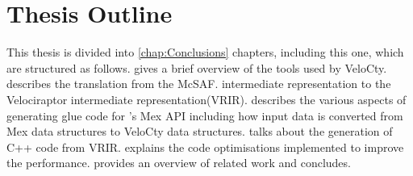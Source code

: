 \section{Thesis Outline}
This thesis is divided into \ref{chap:Conclusions} chapters, including this one, which are structured as follows.
 gives a brief overview of the tools
used by VeloCty.
 describes the translation from the McSAF.
intermediate representation to the Velociraptor intermediate representation(VRIR).
 describes the various aspects of generating glue code for \matlab's Mex API including how input data is converted from Mex data structures to VeloCty data structures. 
 talks about the generation of C++ code from VRIR.
 explains the code optimisations implemented to improve the performance. 
 provides an overview of related work and
 concludes.
